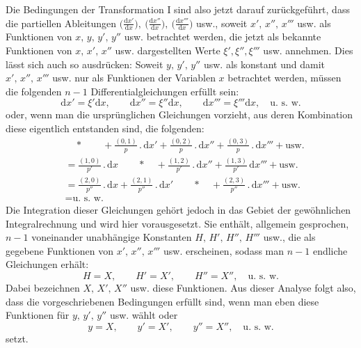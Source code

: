 Die Bedingungen der Transformation I sind also jetzt darauf zurückgeführt, dass die partiellen Ableitungen \(\bigl(\frac{\mathrm{d}x'}{\mathrm{d}x}\bigr),\ \bigl(\frac{\mathrm{d}x''}{\mathrm{d}x}\bigr),\ \bigl(\frac{\mathrm{d}x'''}{\mathrm{d}x}\bigr)\) usw., soweit \(x',\,x'',\,x'''\) usw. als Funktionen von \(x,\,y,\,y',\,y''\) usw. betrachtet werden, die jetzt als bekannte Funktionen von \(x,\,x',\,x''\) usw. dargestellten Werte \(\xi',\xi'',\xi'''\) usw. annehmen. Dies lässt sich auch so ausdrücken: Soweit \(y,\,y',\,y''\) usw. als konstant und damit \(x',\,x'',\,x'''\) usw. nur als Funktionen der Variablen \(x\) betrachtet werden, müssen die folgenden \(n-1\) Differentialgleichungen erfüllt sein:
\[
\mathrm{d}x'=\xi'\mathrm{d}x,\qquad
\mathrm{d}x''=\xi''\mathrm{d}x,\qquad
\mathrm{d}x'''=\xi'''\mathrm{d}x,\quad\text{u.\ s.\ w.}
\]
oder, wenn man die ursprünglichen Gleichungen vorzieht, aus deren Kombination diese eigentlich entstanden sind, die folgenden:
\[
\begin{aligned}
&\quad *\qquad +\frac{(0,1)}{p}\mathbin{.}\mathrm{d}x'
 +\frac{(0,2)}{p}\mathbin{.}\mathrm{d}x''
 +\frac{(0,3)}{p}\mathbin{.}\mathrm{d}x'''+\text{usw.}\\
&=\frac{(1,0)}{p'}\mathbin{.}\mathrm{d}x\qquad *\quad
 +\frac{(1,2)}{p'}\mathbin{.}\mathrm{d}x''
 +\frac{(1,3)}{p'}\,\mathrm{d}x'''+\text{usw.}\\
&=\frac{(2,0)}{p''}\mathbin{.}\mathrm{d}x
 +\frac{(2,1)}{p''}\mathbin{.}\mathrm{d}x'\qquad *\quad
 +\frac{(2,3)}{p''}\mathbin{.}\mathrm{d}x'''+\text{usw.}\\
&=\text{u.\ s.\ w.}
\end{aligned}
\]
Die Integration dieser Gleichungen gehört jedoch in das Gebiet der gewöhnlichen Integralrechnung und wird hier vorausgesetzt. Sie enthält, allgemein gesprochen, \(n-1\) voneinander unabhängige Konstanten \(H,\,H',\,H'',\,H'''\) usw., die als gegebene Funktionen von \(x',\,x'',\,x'''\) usw. erscheinen, sodass man \(n-1\) endliche Gleichungen erhält:
\[
H=X,\qquad H'=X',\qquad H''=X'',\quad\text{u.\ s.\ w.}
\]
Dabei bezeichnen \(X,\,X',\,X''\) usw. diese Funktionen. Aus dieser Analyse folgt also, dass die vorgeschriebenen Bedingungen erfüllt sind, wenn man eben diese Funktionen für \(y,\,y',\,y''\) usw. wählt oder
\[
y=X,\qquad y'=X',\qquad y''=X'',\quad\text{u.\ s.\ w.}
\]
setzt.

